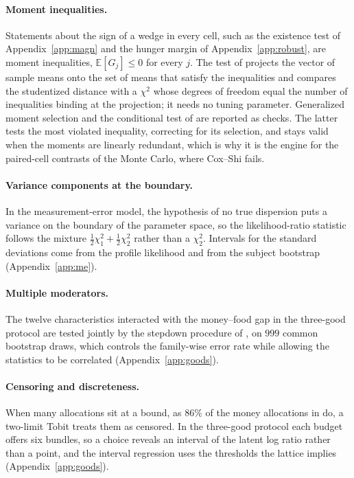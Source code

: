 \documentclass[11pt,a4paper]{article}
\theoremstyle{plain}
\theoremstyle{definition}
\newcommand{\E}{\mathbb{E}}
\begin{document}
\paragraph{Moment inequalities.} Statements about the sign of a wedge in every cell, such as the existence test of
Appendix~\ref{app:magn} and the hunger margin of Appendix~\ref{app:robust}, are moment inequalities, $\E[G_j]\le0$
for every $j$. The test of \citet{coxshi2023} projects the vector of sample means onto the set of means that satisfy the
inequalities and compares the studentized distance with a $\chi^2$ whose degrees of freedom equal the number of
inequalities binding at the projection; it needs no tuning parameter. Generalized moment selection
\citep{andrewssoares2010} and the conditional test of \citet{arp2023} are reported as checks. The latter tests the most
violated inequality, correcting for its selection, and stays valid when the moments are linearly redundant, which is
why it is the engine for the paired-cell contrasts of the Monte Carlo, where Cox--Shi fails.

\paragraph{Variance components at the boundary.} In the measurement-error model, the hypothesis of no true dispersion
puts a variance on the boundary of the parameter space, so the likelihood-ratio statistic follows the mixture
$\tfrac12\chi^2_1+\tfrac12\chi^2_2$ \citep{stramlee1994} rather than a $\chi^2_2$. Intervals for the standard
deviations come from the profile likelihood and from the subject bootstrap (Appendix~\ref{app:me}).

\paragraph{Multiple moderators.} The twelve characteristics interacted with the money--food gap in the three-good
protocol are tested jointly by the stepdown procedure of \citet{romanowolf2005}, on $999$ common bootstrap draws, which
controls the family-wise error rate while allowing the statistics to be correlated (Appendix~\ref{app:goods}).

\paragraph{Censoring and discreteness.} When many allocations sit at a bound, as $86\%$ of the money allocations in
\citet{ans2015} do, a two-limit Tobit treats them as censored. In the three-good protocol each budget offers six
bundles, so a choice reveals an interval of the latent log ratio rather than a point, and the interval regression uses
the thresholds the lattice implies (Appendix~\ref{app:goods}).
\end{document}
